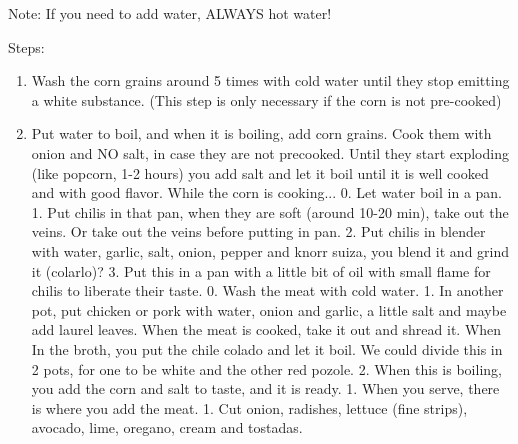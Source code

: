 \documentclass[12pt]{article}
\begin{document}
Note: If you need to add water, ALWAYS hot water!

Steps:
\begin{enumerate}
\setlength\itemsep{0em}
    \item Wash the corn grains around 5 times with cold water until they stop emitting a white substance. (This step is only necessary if the corn is not pre-cooked) 
    \item Put water to boil, and when it is boiling, add corn grains. Cook them with onion and NO salt, in case they are not precooked. Until they start exploding (like popcorn, 1-2 hours) you add salt and let it boil until it is well cooked and with good flavor.
 While the corn is cooking...
 0. Let water boil in a pan.
  1. Put chilis in that pan, when they are soft (around 10-20 min), take out the veins. Or take out the veins before putting in pan.
 2. Put chilis in blender with water, garlic, salt, onion, pepper and knorr suiza, you blend it and grind it (colarlo)?
 3. Put this in a pan with a little bit of oil with small flame for chilis to liberate their taste.
 0. Wash the meat with cold water.
 1. In another pot, put chicken or pork with water, onion and garlic, a little salt and maybe add laurel leaves. When the meat is cooked, take it out and shread it. When In the broth, you put the chile colado and let it boil.  We could divide this in 2 pots, for one to be white and the other red pozole.
 2. When this is boiling, you add the corn and salt to taste, and it is ready.
 1. When you serve, there is where you add the meat.
 1. Cut onion, radishes, lettuce (fine strips), avocado, lime, oregano, cream and tostadas.
\end{enumerate}
  
  
\end{document}
